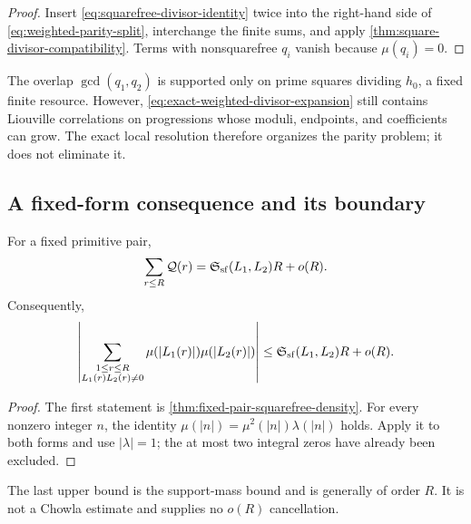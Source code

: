 \begin{proof}
Insert \eqref{eq:squarefree-divisor-identity} twice into the
right-hand side of \eqref{eq:weighted-parity-split}, interchange the
finite sums, and apply
\cref{thm:square-divisor-compatibility}.  Terms with nonsquarefree
\(q_i\) vanish because \(\mu(q_i)=0\).
\end{proof}

\begin{remark}
\label{rem:divisor-expansion-exposes}
The overlap \(\gcd(q_1,q_2)\) is supported only on prime squares
dividing \(h_0\), a fixed finite resource.  However,
\eqref{eq:exact-weighted-divisor-expansion} still contains Liouville
correlations on progressions whose moduli, endpoints, and
coefficients can grow.  The exact local resolution therefore
organizes the parity problem; it does not eliminate it.
\end{remark}

\subsection{A fixed-form consequence and its boundary}

\begin{corollary}
\label{cor:unsigned-support-mass}
For a fixed primitive pair,
\[
 \sum_{r\le R}\mathcal Q(r)
 =
 \mathfrak S_{\mathrm{sf}}(L_1,L_2)R+o(R).
\]
Consequently,
\[
 \left|
 \sum_{\substack{1\le r\le R\\L_1(r)L_2(r)\ne0}}
 \mu(|L_1(r)|)\mu(|L_2(r)|)
 \right|
 \le
 \mathfrak S_{\mathrm{sf}}(L_1,L_2)R+o(R).
\]
\end{corollary}

\begin{proof}
The first statement is
\cref{thm:fixed-pair-squarefree-density}.  For every nonzero integer
\(n\), the identity
\(\mu(|n|)=\mu^2(|n|)\lambda(|n|)\) holds.  Apply it to both forms
and use \(|\lambda|=1\); the at most two integral zeros have already
been excluded.
\end{proof}

\begin{remark}
The last upper bound is the support-mass bound and is generally of
order \(R\).  It is not a Chowla estimate and supplies no
\(o(R)\) cancellation.
\end{remark}

